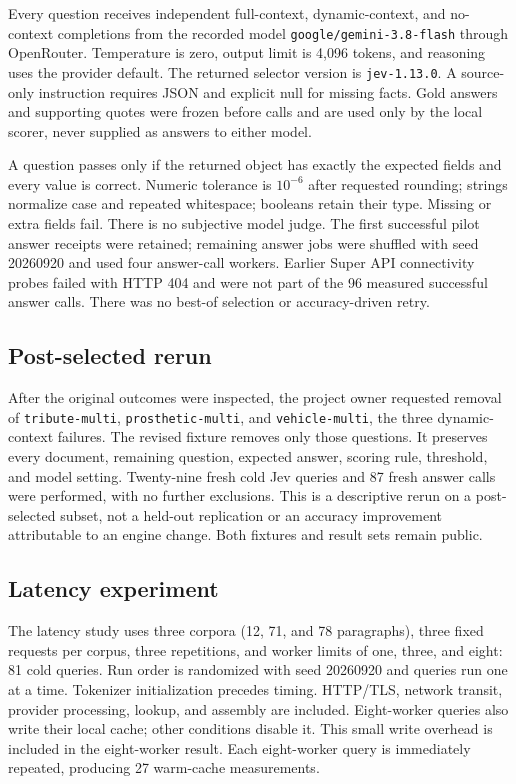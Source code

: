 \documentclass[11pt]{article}
\begin{document}
Every question receives independent full-context, dynamic-context, and no-context completions from the recorded model \texttt{google/gemini-3.8-flash} through OpenRouter. Temperature is zero, output limit is 4,096 tokens, and reasoning uses the provider default. The returned selector version is \texttt{jev-1.13.0}. A source-only instruction requires JSON and explicit null for missing facts. Gold answers and supporting quotes were frozen before calls and are used only by the local scorer, never supplied as answers to either model.

A question passes only if the returned object has exactly the expected fields and every value is correct. Numeric tolerance is $10^{-6}$ after requested rounding; strings normalize case and repeated whitespace; booleans retain their type. Missing or extra fields fail. There is no subjective model judge. The first successful pilot answer receipts were retained; remaining answer jobs were shuffled with seed 20260920 and used four answer-call workers. Earlier Super API connectivity probes failed with HTTP 404 and were not part of the 96 measured successful answer calls. There was no best-of selection or accuracy-driven retry.

\subsection{Post-selected rerun}
After the original outcomes were inspected, the project owner requested removal of \texttt{tribute-multi}, \texttt{prosthetic-multi}, and \texttt{vehicle-multi}, the three dynamic-context failures. The revised fixture removes only those questions. It preserves every document, remaining question, expected answer, scoring rule, threshold, and model setting. Twenty-nine fresh cold Jev queries and 87 fresh answer calls were performed, with no further exclusions. This is a descriptive rerun on a post-selected subset, not a held-out replication or an accuracy improvement attributable to an engine change. Both fixtures and result sets remain public.

\subsection{Latency experiment}
The latency study uses three corpora (12, 71, and 78 paragraphs), three fixed requests per corpus, three repetitions, and worker limits of one, three, and eight: 81 cold queries. Run order is randomized with seed 20260920 and queries run one at a time. Tokenizer initialization precedes timing. HTTP/TLS, network transit, provider processing, lookup, and assembly are included. Eight-worker queries also write their local cache; other conditions disable it. This small write overhead is included in the eight-worker result. Each eight-worker query is immediately repeated, producing 27 warm-cache measurements.
\end{document}
